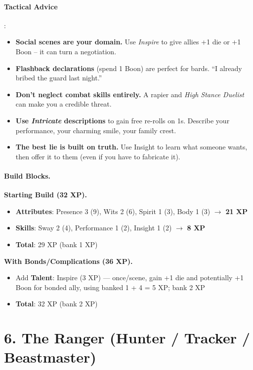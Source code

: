 \paragraph{Tactical Advice}:
\begin{itemize}
\item \textbf{Social scenes are your domain.} Use \emph{Inspire} to give allies +1 die or +1 Boon -- it can turn a negotiation.
\item \textbf{Flashback declarations} (spend 1 Boon) are perfect for bards. ``I already bribed the guard last night.''
\item \textbf{Don't neglect combat skills entirely.} A rapier and \emph{High Stance Duelist} can make you a credible threat.
\item \textbf{Use \emph{Intricate} descriptions} to gain free re-rolls on 1s. Describe your performance, your charming smile, your family crest.
\item \textbf{The best lie is built on truth.} Use Insight to learn what someone wants, then offer it to them (even if you have to fabricate it).
\end{itemize}

\paragraph{Build Blocks.}
\textbf{Starting Build (32 XP).}
\begin{itemize}
\item \textbf{Attributes}: Presence 3 (9), Wits 2 (6), Spirit 1 (3), Body 1 (3) \(\rightarrow\) \textbf{21 XP}
\item \textbf{Skills}: Sway 2 (4), Performance 1 (2), Insight 1 (2) \(\rightarrow\) \textbf{8 XP}
\item \textbf{Total}: 29 XP (bank 1 XP)
\end{itemize}
\textbf{With Bonds/Complications (36 XP).}
\begin{itemize}
\item Add \textbf{Talent}: Inspire (3 XP) --- once/scene, gain +1 die and potentially +1 Boon for bonded ally, using banked 1 + 4 = 5 XP; bank 2 XP
\item \textbf{Total}: 32 XP (bank 2 XP)
\end{itemize}

\section{6. The Ranger (Hunter / Tracker / Beastmaster)}
\label{sec:concept-ranger}

